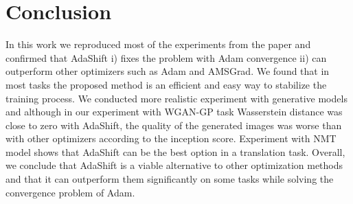 \documentclass{article} %
\begin{document}
\section{Conclusion}
In this work we reproduced most of the experiments from the paper and confirmed that AdaShift i) fixes the problem
with Adam convergence ii) can outperform other
optimizers such as Adam and AMSGrad.
We found that in most tasks the proposed method is an efficient and easy way to stabilize the training process.  %
We conducted more realistic experiment with generative models and although in our experiment with WGAN-GP task Wasserstein distance was close to zero with AdaShift, the quality of the generated images was worse than with other optimizers according to the inception score.
Experiment with NMT model shows that AdaShift can be the best option in a translation task. Overall, we conclude that AdaShift is a viable alternative to other optimization methods and that it can outperform them significantly on some tasks while solving the convergence problem of Adam.



\end{document}
